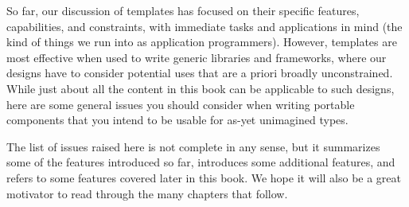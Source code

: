 So far, our discussion of templates has focused on their specific features, capabilities, and constraints, with immediate tasks and applications in mind (the kind of things we run into as application programmers). However, templates are most effective when used to write generic libraries and frameworks, where our designs have to consider potential uses that are a priori broadly unconstrained. While just about all the content in this book can be applicable to such designs, here are some general issues you should consider when writing portable components that you intend to be usable for as-yet unimagined types.

The list of issues raised here is not complete in any sense, but it summarizes some of the features introduced so far, introduces some additional features, and refers to some features covered later in this book. We hope it will also be a great motivator to read through the many chapters that follow.